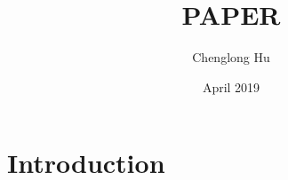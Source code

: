 \documentclass{article}
\title{PAPER}
\author{Chenglong Hu}
\date{April 2019}
\begin{document}
\maketitle

\section{Introduction}
\end{document}
